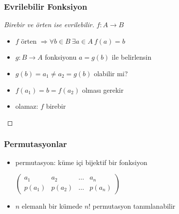 \documentclass[dvipsnames]{beamer}
\theoremstyle{definition}
\theoremstyle{example}
\theoremstyle{plain}
\begin{document}
\begin{frame}
  \frametitle{Evrilebilir Fonksiyon}

  \begin{proof}[Birebir ve örten ise evrilebilir]
    $f: A \rightarrow B$
    \begin{itemize}
      \item $f$ örten $\Rightarrow \forall b \in B~\exists a \in A~f(a)=b$
      \item $g: B \rightarrow A$ fonksiyonu $a=g(b)$ ile belirlensin

      \pause
      \medskip
      \item $g(b) = a_1 \neq a_2 = g(b)$ olabilir mi?

      \pause
      \item $f(a_1) = b = f(a_2)$ olması gerekir

      \pause
      \item olamaz: $f$ birebir
    \end{itemize}
  \end{proof}
\end{frame}

\begin{frame}
  \frametitle{Permutasyonlar}

  \begin{itemize}
    \item permutasyon: küme içi bijektif bir fonksiyon

    \medskip
    $\left(
      \begin{array}{cccc}
       a_1   &  a_2   & \dots &  a_n\\
      p(a_1) & p(a_2) & \dots & p(a_n)
      \end{array}
    \right)$

    \pause
    \medskip
    \item $n$ elemanlı bir kümede $n!$ permutasyon tanımlanabilir
  \end{itemize}
\end{frame}
\end{document}
